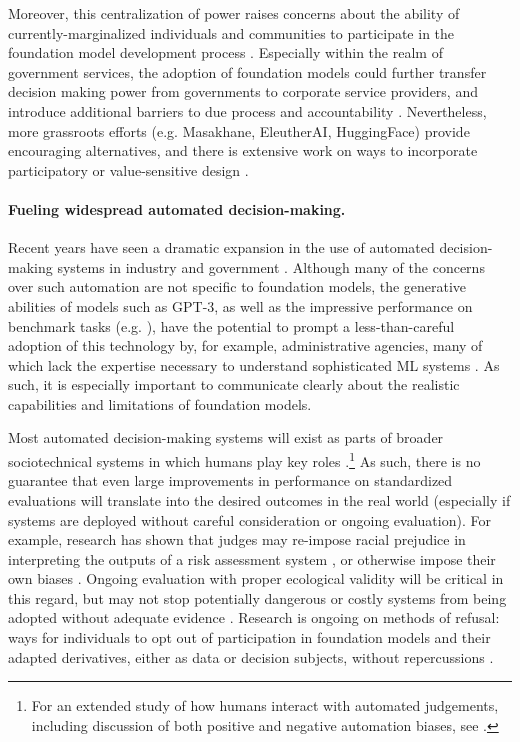 Moreover, this centralization of power raises concerns about the ability of currently-marginalized individuals and communities to participate in the foundation model development process \citep{kalluri.2020}.  Especially within the realm of government services, the adoption of foundation models could further transfer decision making power from governments to corporate service providers, and introduce additional barriers to due process and accountability \citep{citron.2008}. Nevertheless, more grassroots efforts (e.g. Masakhane, EleutherAI, HuggingFace) provide encouraging alternatives, and there is extensive work on ways to incorporate participatory or value-sensitive design  \citep{friedman.2019, prabhakaran.2020}.

\paragraph{Fueling widespread automated decision-making.}

Recent years have seen a dramatic expansion in the use of automated decision-making systems in industry and government \citep{oneil.2016, engstrom2020government}. Although many of the concerns over such automation are not specific to foundation models, the generative abilities of models such as GPT-3, as well as the impressive performance on benchmark tasks (e.g. \citet{devlin2019bert}), have the potential to prompt a less-than-careful adoption of this technology by, for example, administrative agencies, many of which lack the expertise necessary to understand sophisticated ML systems \citep{calo.2021}. As such, it is especially important to communicate clearly about the realistic capabilities and limitations of foundation models.

Most automated decision-making systems will exist as parts of broader sociotechnical systems in which humans play key roles \citep{selbst.2018}.\footnote{For an extended study of how humans interact with automated judgements, including discussion of both positive and negative automation biases, see \citet{hidalgo2021how}.} 
As such, there is no guarantee that even large improvements in performance on standardized evaluations will translate into the desired outcomes in the real world (especially if systems are deployed without careful consideration or ongoing evaluation). For example, research has shown that judges may re-impose racial prejudice in interpreting the outputs of a risk assessment system \citep{albright.2019}, or otherwise impose their own biases \citep{stevenson.2021}. Ongoing evaluation with proper ecological validity \citep{vries2020ecological} will be critical in this regard, but may not stop potentially dangerous or costly systems from being adopted without adequate evidence \citep{ferguson.2017}. Research is ongoing on methods of refusal: ways for individuals to opt out of participation in foundation models and their adapted derivatives, either as data or decision subjects, without repercussions   \citep{benjamin_ruha_bioethics}.

